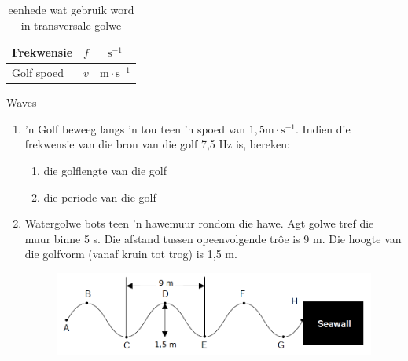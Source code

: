 \begin{definition}
\begin{table}[H]
\begin{center}
\begin{tabular}{|l|c|c|c|}
Frekwensie & $f$ & \multicolumn{2}{c|}{$\text{s}^{-1}$}  \\ \hline
Golf spoed & $v$ & \multicolumn{2}{c|}{$\text{m} \cdot \text{s}^{-1}$} \\ \hline
\end{tabular}
\end{center}
\caption{eenhede wat gebruik word in transversale golwe}
\label{table:electricity::units}
\end{table}
    \begin{eocexercises}{Waves}
            \nopagebreak
\label{m38806*id324367}\begin{enumerate}[noitemsep, label=\textbf{\arabic*}. ] 
\label{m38806*uid128}\item   'n Golf beweeg langs  'n tou teen  'n spoed van $1,5\text{m}\ensuremath{\cdot}\text{s}{}^{-1}$. Indien die frekwensie van die bron van die golf 7,5 Hz is, bereken:
\label{m38806*id324525}\begin{enumerate}[noitemsep, label=\textbf{\alph*}. ] 
            \label{m38806*uid129}\item die golflengte van die golf
\label{m38806*uid130}\item die periode van die golf
\end{enumerate}
                \item Watergolwe bots teen  'n  hawemuur rondom die hawe. Agt golwe tref die muur
           binne 5 s. Die afstand tussen opeenvolgende trôe is 9 m. Die hoogte van
          die golfvorm (vanaf kruin tot trog) is 1,5 m.
    \setcounter{subfigure}{0}
	\begin{figure}[H] %
    \begin{center}
    \label{m38806*id634524!!!underscore!!!media}\label{m38806*id634524!!!underscore!!!printimage}\includegraphics[width=0.8\columnwidth]{col11305.imgs/m38806_seawall.png} %
      \vspace{2pt}
    \vspace{.1in}
    \end{center}
 \end{figure}       
\label{m38806*uid081231}\begin{enumerate}[noitemsep, label=\textbf{\alph*}. ] 

\end{enumerate}
\end{enumerate}
\end{eocexercises}
\end{definition}
